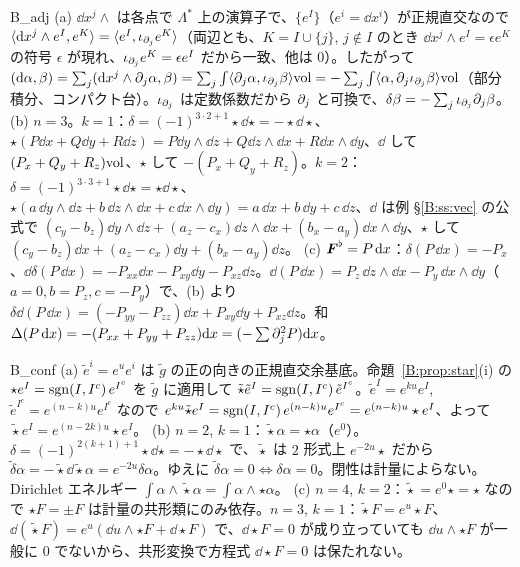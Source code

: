 \begin{soll}{B_adj}
(a) $\dd x^j\wedge$ は各点で $\Lambda^*$ 上の演算子で、$\{e^I\}$（$e^i=\dd x^i$）が正規直交なので $\langle\mathrm{d} x^j\wedge e^I,e^K\rangle=\langle e^I,\iota_{\partial_j}e^K\rangle$（両辺とも、$K=I\cup\{j\}$, $j\notin I$ のとき $\dd x^j\wedge e^I=\epsilon e^K$ の符号 $\epsilon$ が現れ、$\iota_{\partial_j}e^K=\epsilon e^I$ だから一致、他は $0$）。したがって $(\mathrm{d}\alpha,\beta)=\sum_j(\mathrm{d} x^j\wedge\partial_j\alpha,\beta)=\sum_j\int\langle\partial_j\alpha,\iota_{\partial_j}\beta\rangle\mathrm{vol}=-\sum_j\int\langle\alpha,\partial_j\iota_{\partial_j}\beta\rangle\mathrm{vol}$（部分積分、コンパクト台）。$\iota_{\partial_j}$ は定数係数だから $\partial_j$ と可換で、$\delta\beta=-\sum_j\iota_{\partial_j}\partial_j\beta$。
(b) $n=3$。$k=1$：$\delta=(-1)^{3\cdot2+1}\star\dd\star=-\star\dd\star$、$\star(P\dd x+Q\dd y+R\dd z)=P\dd y\wedge\dd z+Q\dd z\wedge\dd x+R\dd x\wedge\dd y$、$\dd$ して $(P_x+Q_y+R_z)\mathrm{vol}$、$\star$ して $-(P_x+Q_y+R_z)$。$k=2$：$\delta=(-1)^{3\cdot3+1}\star\dd\star=\star\dd\star$、$\star(a\,\dd y\wedge\dd z+b\,\dd z\wedge\dd x+c\,\dd x\wedge\dd y)=a\,\dd x+b\,\dd y+c\,\dd z$、$\dd$ は例 \S\ref{B:ss:vec} の公式で $(c_y-b_z)\dd y\wedge\dd z+(a_z-c_x)\dd z\wedge\dd x+(b_x-a_y)\dd x\wedge\dd y$、$\star$ して $(c_y-b_z)\dd x+(a_z-c_x)\dd y+(b_x-a_y)\dd z$。
(c) $\boldsymbol F^\flat=P\,\mathrm{d} x$：$\delta(P\,\dd x)=-P_x$、$\dd\delta(P\,\dd x)=-P_{xx}\dd x-P_{xy}\dd y-P_{xz}\dd z$。$\dd(P\,\dd x)=P_z\,\dd z\wedge\dd x-P_y\,\dd x\wedge\dd y$（$a=0,b=P_z,c=-P_y$）で、(b) より $\delta\dd(P\,\dd x)=(-P_{yy}-P_{zz})\dd x+P_{xy}\dd y+P_{xz}\dd z$。和 $\Delta(P\,\mathrm{d} x)=-(P_{xx}+P_{yy}+P_{zz})\mathrm{d} x=(-\sum\partial_j^2P)\mathrm{d} x$。
\end{soll}

\begin{soll}{B_conf}
(a) $\tilde e^i=e^ue^i$ は $\tilde g$ の正の向きの正規直交余基底。命題~\ref{B:prop:star}(i) の $\star e^I=\operatorname{sgn}(I,I^c)\,e^{I^c}$ を $\tilde g$ に適用して $\tilde\star\tilde e^I=\operatorname{sgn}(I,I^c)\,\tilde e^{I^c}$。$\tilde e^I=e^{ku}e^I$, $\tilde e^{I^c}=e^{(n-k)u}e^{I^c}$ なので $e^{ku}\tilde\star e^I=\operatorname{sgn}(I,I^c)\,e^{(n-k)u}e^{I^c}=e^{(n-k)u}\star e^I$、よって $\tilde\star e^I=e^{(n-2k)u}\star e^I$。
(b) $n=2$, $k=1$：$\tilde\star\alpha=\star\alpha$（$e^{0}$）。$\delta=(-1)^{2(k+1)+1}\star\dd\star=-\star\dd\star$ で、$\tilde\star$ は $2$ 形式上 $e^{-2u}\star$ だから $\tilde\delta\alpha=-\tilde\star\dd\tilde\star\alpha=e^{-2u}\delta\alpha$。ゆえに $\tilde\delta\alpha=0\iff\delta\alpha=0$。閉性は計量によらない。Dirichlet エネルギー $\int\alpha\wedge\tilde\star\alpha=\int\alpha\wedge\star\alpha$。
(c) $n=4$, $k=2$：$\tilde\star=e^{0}\star=\star$ なので $\star F=\pm F$ は計量の共形類にのみ依存。$n=3$, $k=1$：$\tilde\star F=e^{u}\star F$、$\dd(\tilde\star F)=e^u(\dd u\wedge\star F+\dd\star F)$ で、$\dd\star F=0$ が成り立っていても $\dd u\wedge\star F$ が一般に $0$ でないから、共形変換で方程式 $\dd\star F=0$ は保たれない。
\end{soll}

